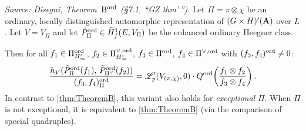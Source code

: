 \begin{theorem}
  \label{thm:TheoremBord}
%
  \textit{Source: Disegni, Theorem~$\mathrm{B}^{\mathrm{ord}}$ (§7.1, ``GZ thm'\,'').}
  Let $\Pi = \pi \otimes \chi$ be an ordinary, locally distinguished
  automorphic representation of $(G \times H)'(\mathbf{A})$ over $L$.  Let
  $V = V_\Pi$ and let
  $\tilde P^{\mathrm{ord}}_\Pi \in \widetilde{H}^1_f(E, V_\Pi)$ be the enhanced ordinary
  Heegner class.

  Then for all $f_1 \in \Pi^{\mathrm{ord}}_{H'_\infty}$,
  $f_2 \in \Pi^{\vee,\mathrm{ord}}_{H'_\infty}$, $f_3 \in \Pi^{\mathrm{ord}}$,
  $f_4 \in \Pi^{\vee,\mathrm{ord}}$ with $(f_3, f_4)^{\mathrm{ord}} \neq 0$:
  \[
    \frac{h_V(\tilde P^{\mathrm{ord}}_\Pi(f_1),\, \tilde P^{\mathrm{ord}}_{\Pi^\vee}(f_2))}
         {(f_3, f_4)^{\mathrm{ord}}_\Pi}
    =
    \mathscr{L}_p'(V_{(\pi,\chi)}, 0)
    \cdot
    Q^{\mathrm{ord}}\!\left(\frac{f_1 \otimes f_2}{f_3 \otimes f_4}\right).
  \]
  In contrast to \cref{thm:TheoremB}, this variant also holds for
  \emph{exceptional} $\Pi$.  When $\Pi$ is not exceptional, it is
  equivalent to \cref{thm:TheoremB} (via the comparison of special
  quadruples).
\end{theorem}


